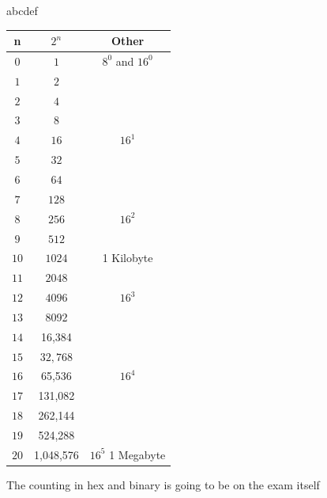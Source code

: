 \documentclass[letterpaper,12pt]{exam}
\begin{document}
abcdef

\begin{center}
\begin{tabular}{| c | c | c |}
    \hline
        n & $2^n$ & Other \\
        \hline
    $0$ & $ 1 $ & $8^0$ and $16^0$ \\ 
    $1$ & $ 2 $ & \  \\ 
\hline
    $2$ & $ 4 $ & \  \\ 
    $3$ & $ 8 $ & \  \\ 
\hline
    $4$ & $ 16 $ & $16^1$ \\ 
    $5$ & $ 32 $ & \  \\ 
\hline
    $6$ & $ 64 $ & \  \\ 
    $7$ & $ 128 $ & \  \\ 
\hline
    $8$ & $ 256 $ & $16^2$ \\ 
    $9$ & $ 512 $ & \  \\ 
\hline
    $10$ & $ 1024 $ & 1 Kilobyte \\ 
    $11$ & $ 2048 $ & \  \\ 
\hline
    $12$ & $ 4096 $ & $16^3$ \\ 
    $13$ & {\color{lightgray}  8092}  & \  \\ 
\hline
    $14$ &  {\color{lightgray}  16,384} & \  \\ 
    $15$ & $ 32,768 $ & \  \\ 
\hline
    $16$ &   65,536  & $16^4$ \\ 
    $17$ & {\color{lightgray} 131,082 } & \  \\ 
\hline
      $18$ &   {\color{lightgray}  262,144} & \  \\ 
    $19$ &  {\color{lightgray} 524,288 } & \  \\ 
\hline
      $20$ & 1,048,576  & $16^5$ 1 Megabyte \\  
\hline
    \end{tabular}
\end{center}
\par
\begin{center}
The counting in hex and binary is going to be on the exam itself
\end{center}
\end{document}
